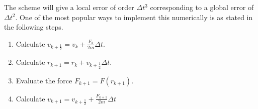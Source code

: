 The scheme will give a local error of order $\Delta t^3$ corresponding to a global error of $\Delta t^2$. One of the most popular ways to implement this numerically is as stated in the following steps.
\begin{enumerate}
  \centering
  \item Calculate $v_{k+\frac{1}{2}} = v_k + \frac{F_k}{2m} \Delta t$.
  \item Calculate $r_{k+1} = r_k + v_{k+\frac{1}{2}} \Delta t$.
  \item Evaluate the force $F_{k+1} = F(r_{k+1})$.
  \item Calculate $v_{k+1} = v_{k+\frac{1}{2}} + \frac{F_{k+1}}{2m} \Delta t$  
\end{enumerate}











